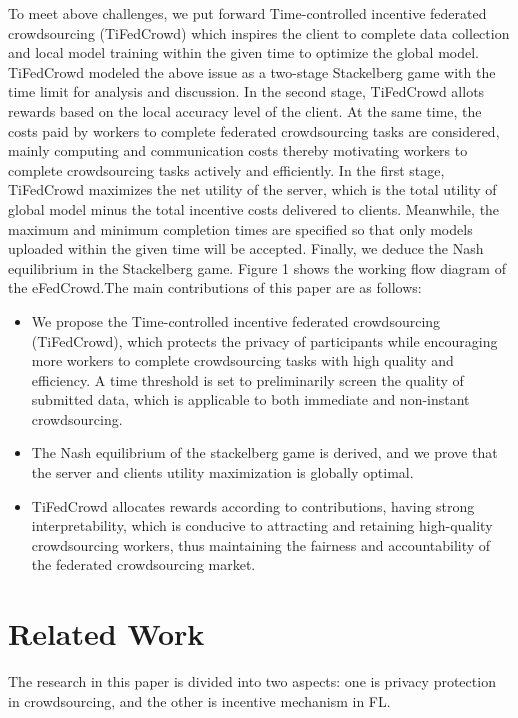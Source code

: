 \documentclass[final,1p,times]{elsarticle}
\begin{document}
To meet above challenges, we put forward Time-controlled incentive federated crowdsourcing (TiFedCrowd) which inspires the client to complete data collection and local model training within the given time to optimize the global model. TiFedCrowd modeled the above issue as a two-stage Stackelberg game \citep{li2017review} with the time limit for analysis and discussion. In the second stage, TiFedCrowd allots rewards based on the local accuracy level of the client. At the same time, the costs paid by workers to complete federated crowdsourcing tasks are considered, mainly computing and communication costs thereby motivating workers to complete crowdsourcing tasks actively and efficiently. In the first stage, TiFedCrowd maximizes the net utility of the server, which is the total utility of global model minus the total incentive costs delivered to clients. Meanwhile, the maximum and minimum completion times are specified so that only models uploaded within the given time will be accepted. Finally, we deduce the Nash equilibrium in the Stackelberg game. Figure 1 shows the working flow diagram of the eFedCrowd.The main contributions of this paper are as follows:
\begin{itemize}
	\item We propose the Time-controlled incentive federated crowdsourcing (TiFedCrowd), which protects the privacy of participants while encouraging more workers to complete crowdsourcing tasks with high quality and efficiency. A time threshold is set to preliminarily screen the quality of submitted data, which is applicable to both immediate and non-instant crowdsourcing.
	\item The Nash equilibrium of the stackelberg game is derived, and we prove that the server and clients utility maximization is globally optimal.
	\item TiFedCrowd allocates rewards according to contributions, having strong interpretability, which is conducive to attracting and retaining high-quality crowdsourcing workers, thus maintaining the fairness and accountability of the federated crowdsourcing market.
\end{itemize}

\section{Related Work}
The research in this paper is divided into two aspects: one is privacy protection in crowdsourcing, and the other is incentive mechanism in FL.
\end{document}
